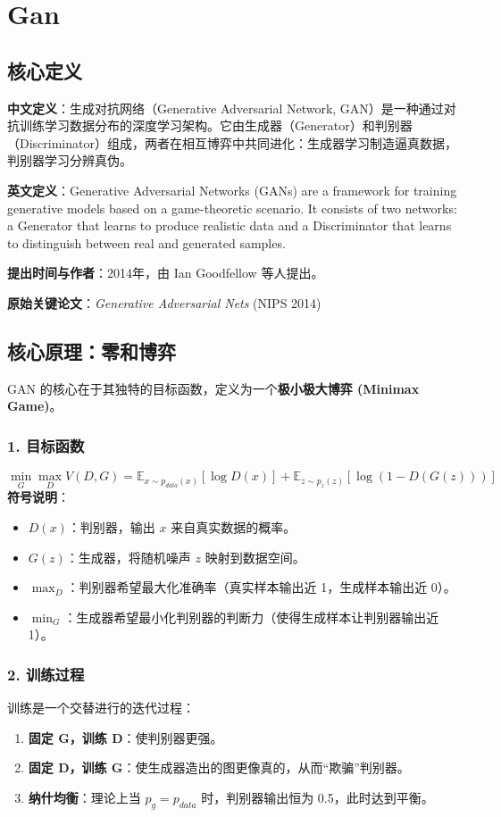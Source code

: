 \documentclass[12pt, a4paper]{book}
\begin{document}
\chapter{Gan}


\section{核心定义}
\textbf{中文定义}：生成对抗网络（Generative Adversarial Network, GAN）是一种通过对抗训练学习数据分布的深度学习架构。它由生成器（Generator）和判别器（Discriminator）组成，两者在相互博弈中共同进化：生成器学习制造逼真数据，判别器学习分辨真伪。

\textbf{英文定义}：Generative Adversarial Networks (GANs) are a framework for training generative models based on a game-theoretic scenario. It consists of two networks: a Generator that learns to produce realistic data and a Discriminator that learns to distinguish between real and generated samples.

\textbf{提出时间与作者}：2014年，由 Ian Goodfellow 等人提出。

\textbf{原始关键论文}：\textit{Generative Adversarial Nets} (NIPS 2014)

\section{核心原理：零和博弈}
GAN 的核心在于其独特的目标函数，定义为一个\textbf{极小极大博弈 (Minimax Game)}。

\subsection{1. 目标函数}
$$ \min_G \max_D V(D, G) = \mathbb{E}_{x \sim p_{data}(x)}[\log D(x)] + \mathbb{E}_{z \sim p_z(z)}[\log(1 - D(G(z)))] $$
\textbf{符号说明}：
\begin{itemize}
    \item $D(x)$：判别器，输出 $x$ 来自真实数据的概率。
    \item $G(z)$：生成器，将随机噪声 $z$ 映射到数据空间。
    \item $\max_D$：判别器希望最大化准确率（真实样本输出近 1，生成样本输出近 0）。
    \item $\min_G$：生成器希望最小化判别器的判断力（使得生成样本让判别器输出近 1）。
\end{itemize}

\subsection{2. 训练过程}
训练是一个交替进行的迭代过程：
\begin{enumerate}
    \item \textbf{固定 G，训练 D}：使判别器更强。
    \item \textbf{固定 D，训练 G}：使生成器造出的图更像真的，从而“欺骗”判别器。
    \item \textbf{纳什均衡}：理论上当 $p_g = p_{data}$ 时，判别器输出恒为 0.5，此时达到平衡。
\end{enumerate}
\end{document}
